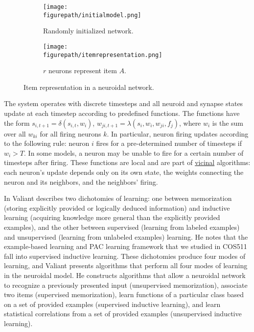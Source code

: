 \documentclass[letterpaper, 12pt]{article}
\newcommand{\figurepath}{../../Figures}
\begin{document}
\begin{figure}[!htb]
\centering
\begin{subfigure}[b]{0.45\textwidth}
      \texttt{[image: \\figurepath/initialmodel.png]}
      \caption*{Randomly initialized network.}
\end{subfigure}
\begin{subfigure}[b]{0.45\textwidth}
      \texttt{[image: \\figurepath/itemrepresentation.png]}
      \caption*{$r$ neurons represent item $A$.}
\end{subfigure}
\caption{Item representation in a neuroidal network.}
\label{fig:itemrepresentation}
\end{figure}

The system operates with discrete timesteps and all neuroid and synapse states update at each timestep according to predefined functions. The functions have the form $s_{i,t+1}=\delta(s_{i,t},w_i)$, $w_{ji,t+1}=\lambda(s_i,w_i,w_{ji},f_j)$, where $w_i$ is the sum over all $w_{ki}$ for all firing neurons $k$. In particular, neuron firing updates according to the following rule: neuron $i$ fires for a pre-determined number of timesteps if $w_i>T$. In some models, a neuron may be unable to fire for a certain number of timesteps after firing. These functions are local and are part of \underline{vicinal} algorithms: each neuron's update depends only on its own state, the weights connecting the neuron and its neighbors, and the neighbors' firing. 

In \cite{valiant_circuits_1994} Valiant describes two dichotomies of learning: one between memorization (storing explicitly provided or logically deduced information) and inductive learning (acquiring knowledge more general than the explicitly provided examples), and the other between supervised (learning from labeled examples) and unsupervised (learning from unlabeled examples) learning. He notes that the example-based learning and PAC learning framework that we studied in COS511 fall into supervised inductive learning. These dichotomies produce four modes of learning, and Valiant presents algorithms that perform all four modes of learning in the neuroidal model. He constructs algorithms that allow a neuroidal network to recognize a previously presented input (unsupervised memorization), associate two items (supervised memorization), learn functions of a particular class based on a set of provided examples (supervised inductive learning), and learn statistical correlations from a set of provided examples (unsupervised inductive learning).
\end{document}
